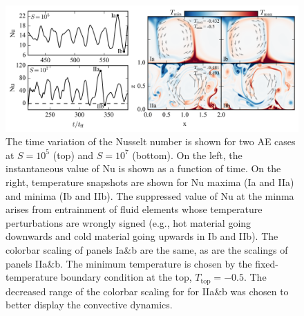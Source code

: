 \begin{figure}[ht!]
\includegraphics[width=\textwidth]{./figs/oscillating_plumes.pdf}
\caption[Dynamical description explaining instantaneously negative Nusselt number values]{The time variation of the Nusselt number is shown for two AE cases at
$S = 10^5$ (top) and $S = 10^7$ (bottom). On the left, the instantaneous value of Nu
is shown as a function of time. On the right, temperature snapshots are shown for
Nu maxima (Ia and IIa) and minima (Ib and IIb). The suppressed value of Nu at the
minma arises from entrainment of fluid elements whose temperature perturbations
are wrongly signed (e.g., hot material going downwards and cold material going
upwards in Ib and IIb). The colorbar scaling of panels Ia\&b are the same, as
are the scalings of panels IIa\&b. 
The minimum temperature is chosen by the fixed-temperature
boundary condition at the top, $T_{\text{top}} = -0.5$. The decreased range of
the colorbar scaling for
for IIa\&b was chosen to better display the convective dynamics.
\label{fig:oscillating_plumes} }
\end{figure}

